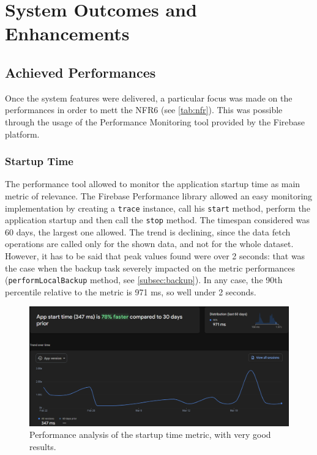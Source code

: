 \section{System Outcomes and Enhancements}

\subsection{Achieved Performances}
Once the system features were delivered, a particular focus was made on the performances in order to mett the NFR6 (see \cref{tab:nfr}). This was possible through the usage of the Performance Monitoring tool provided by the Firebase platform.
\subsubsection{Startup Time}
The performance tool allowed to monitor the application startup time as main metric of relevance. The Firebase Performance library allowed an easy monitoring implementation by creating a \texttt{trace} instance, call his \texttt{start} method, perform the application startup and then call the \texttt{stop} method. The timespan considered was 60 days, the largest one allowed. The trend is declining, since the data fetch operations are called only for the shown data, and not for the whole dataset. However, it has to be said that peak values found were over 2 seconds: that was the case when the backup task severely impacted on the metric performances (\texttt{performLocalBackup} method, see \cref{subsec:backup}). In any case, the 90th percentile relative to the metric is 971 ms, so well under 2 seconds.

\begin{figure}
    \includegraphics[width=1.0\linewidth]{./images/performance.png}
    \caption{Performance analysis of the startup time metric, with very good results.}
\end{figure}
\newpage
